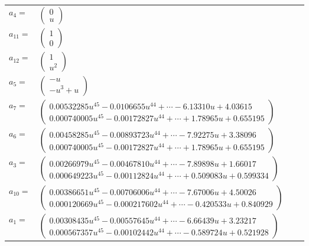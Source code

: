 \documentclass[1p]{elsarticle_modified}
\theoremstyle{definition}
\begin{document}
\begin{tabular}{m{7pt} m{180pt} m{7pt} m{180pt} }
\flushright $a_{4}=$&$\begin{pmatrix}0\\u\end{pmatrix}$ \\
\flushright $a_{11}=$&$\begin{pmatrix}1\\0\end{pmatrix}$ \\
\flushright $a_{12}=$&$\begin{pmatrix}1\\u^2\end{pmatrix}$ \\
\flushright $a_{5}=$&$\begin{pmatrix}- u\\- u^3+u\end{pmatrix}$ \\
\flushright $a_{7}=$&$\begin{pmatrix}0.00532285 u^{45}-0.0106655 u^{44}+\cdots-6.13310 u+4.03615\\0.000740005 u^{45}-0.00172827 u^{44}+\cdots+1.78965 u+0.655195\end{pmatrix}$ \\
\flushright $a_{6}=$&$\begin{pmatrix}0.00458285 u^{45}-0.00893723 u^{44}+\cdots-7.92275 u+3.38096\\0.000740005 u^{45}-0.00172827 u^{44}+\cdots+1.78965 u+0.655195\end{pmatrix}$ \\
\flushright $a_{3}=$&$\begin{pmatrix}0.00266979 u^{45}-0.00467810 u^{44}+\cdots-7.89898 u+1.66017\\0.000649223 u^{45}-0.00112824 u^{44}+\cdots+0.509083 u+0.599334\end{pmatrix}$ \\
\flushright $a_{10}=$&$\begin{pmatrix}0.00386651 u^{45}-0.00706006 u^{44}+\cdots-7.67006 u+4.50026\\0.000120669 u^{45}-0.000217602 u^{44}+\cdots-0.420533 u+0.840929\end{pmatrix}$ \\
\flushright $a_{1}=$&$\begin{pmatrix}0.00308435 u^{45}-0.00557645 u^{44}+\cdots-6.66439 u+3.23217\\0.000567357 u^{45}-0.00102442 u^{44}+\cdots-0.589724 u+0.521928\end{pmatrix}$ \\

\end{tabular}
\end{document}
